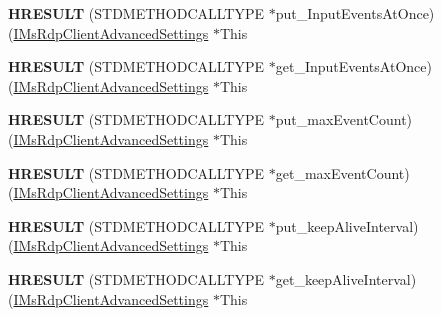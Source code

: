 \begin{DoxyCompactItemize}
{\bfseries H\+R\+E\+S\+U\+LT} (S\+T\+D\+M\+E\+T\+H\+O\+D\+C\+A\+L\+L\+T\+Y\+PE $\ast$put\+\_\+\+Input\+Events\+At\+Once)(\hyperlink{interface_m_s_t_s_c_lib_1_1_i_ms_rdp_client_advanced_settings}{I\+Ms\+Rdp\+Client\+Advanced\+Settings} $\ast$This
\item 
\mbox{\label{struct_m_s_t_s_c_lib_1_1_i_ms_rdp_client_advanced_settings_vtbl_acc256fbbebd396e867a6b7fb615b2a44}} 
{\bfseries H\+R\+E\+S\+U\+LT} (S\+T\+D\+M\+E\+T\+H\+O\+D\+C\+A\+L\+L\+T\+Y\+PE $\ast$get\+\_\+\+Input\+Events\+At\+Once)(\hyperlink{interface_m_s_t_s_c_lib_1_1_i_ms_rdp_client_advanced_settings}{I\+Ms\+Rdp\+Client\+Advanced\+Settings} $\ast$This
\item 
\mbox{\label{struct_m_s_t_s_c_lib_1_1_i_ms_rdp_client_advanced_settings_vtbl_af33f6d575a6938dbb09bc66f11478a34}} 
{\bfseries H\+R\+E\+S\+U\+LT} (S\+T\+D\+M\+E\+T\+H\+O\+D\+C\+A\+L\+L\+T\+Y\+PE $\ast$put\+\_\+max\+Event\+Count)(\hyperlink{interface_m_s_t_s_c_lib_1_1_i_ms_rdp_client_advanced_settings}{I\+Ms\+Rdp\+Client\+Advanced\+Settings} $\ast$This
\item 
\mbox{\label{struct_m_s_t_s_c_lib_1_1_i_ms_rdp_client_advanced_settings_vtbl_ae0fc1005624803fcccece67c616d1fcd}} 
{\bfseries H\+R\+E\+S\+U\+LT} (S\+T\+D\+M\+E\+T\+H\+O\+D\+C\+A\+L\+L\+T\+Y\+PE $\ast$get\+\_\+max\+Event\+Count)(\hyperlink{interface_m_s_t_s_c_lib_1_1_i_ms_rdp_client_advanced_settings}{I\+Ms\+Rdp\+Client\+Advanced\+Settings} $\ast$This
\item 
\mbox{\label{struct_m_s_t_s_c_lib_1_1_i_ms_rdp_client_advanced_settings_vtbl_a7a331fc9d86b4a0ae4f3a758e33a9199}} 
{\bfseries H\+R\+E\+S\+U\+LT} (S\+T\+D\+M\+E\+T\+H\+O\+D\+C\+A\+L\+L\+T\+Y\+PE $\ast$put\+\_\+keep\+Alive\+Interval)(\hyperlink{interface_m_s_t_s_c_lib_1_1_i_ms_rdp_client_advanced_settings}{I\+Ms\+Rdp\+Client\+Advanced\+Settings} $\ast$This
\item 
\mbox{\label{struct_m_s_t_s_c_lib_1_1_i_ms_rdp_client_advanced_settings_vtbl_a8a73f82a84e3d87df522dfaebea88df3}} 
{\bfseries H\+R\+E\+S\+U\+LT} (S\+T\+D\+M\+E\+T\+H\+O\+D\+C\+A\+L\+L\+T\+Y\+PE $\ast$get\+\_\+keep\+Alive\+Interval)(\hyperlink{interface_m_s_t_s_c_lib_1_1_i_ms_rdp_client_advanced_settings}{I\+Ms\+Rdp\+Client\+Advanced\+Settings} $\ast$This

\end{DoxyCompactItemize}
